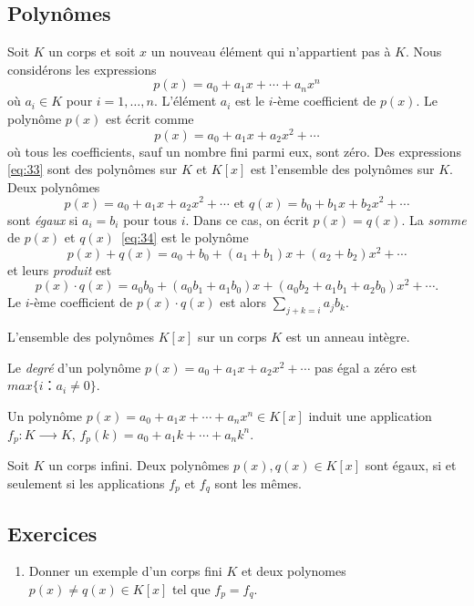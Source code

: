 \subsection{Polynômes}
\label{sec:polynomes}
Soit $K$ un corps et soit $x$ un nouveau élément qui n'appartient pas à $K$. Nous considérons les expressions 
\begin{equation}
  \label{eq:33}
  p(x) = a_0 + a_1 x + \cdots + a_n x^n
\end{equation}
où $a_i ∈K$ pour $i=1,\dots,n$.  L'élément $a_i$ est le $i$-ème coefficient de $p(x)$. Le polynôme $p(x)$ est écrit comme 
\begin{displaymath}
  p(x) = a_0 + a_1x + a_2x^2 + \cdots 
\end{displaymath}
où tous les  coefficients, sauf un nombre fini parmi eux, sont zéro. 
Des expressions \eqref{eq:33} sont des polynômes sur $K$  et $K[x]$ est l'ensemble des polynômes sur $K$. Deux polynômes 
\begin{equation}
  \label{eq:34}
  p(x) = a_0 + a_1x + a_2x^2 + \cdots \text{ et } q(x) = b_0 + b_1x + b_2x^2 + \cdots
  \end{equation}
  sont \emph{égaux} si $a_i  =b_i$ pour tous $i$. Dans ce cas, on écrit $p(x) = q(x)$. 
La \emph{somme} de $p(x)$ et $q(x)$~\eqref{eq:34} est le polynôme 
\begin{displaymath}
  p(x) + q(x)  = a_0+b_0 + (a_1+b_1)x + (a_2+b_2)x^2 + \cdots 
\end{displaymath}
et leurs \emph{produit} est 
\begin{displaymath}
  p(x) ⋅q(x) = a_0 b_0 + (a_0b_1 +a_1b_0) x + (a_0b_2+ a_1b_1 + a_2b_0)x^2 + \cdots .
\end{displaymath}
Le $i$-ème coefficient de $p(x)⋅q(x)$ est alors  $∑_{j+k=i}a_jb_k$. 

\begin{theorem}
  \label{thr:43}
  L'ensemble des polynômes $K[x]$ sur un corps $K$ est un anneau intègre. 
\end{theorem}

Le \emph{degré} d'un polynôme $p(x) = a_0 + a_1x + a_2x^2 + \cdots$ pas égal a zéro est $max\{i： a_i ≠0\}$. 

Un polynôme $p(x) = a_0 + a_1 x + \cdots + a_n x^n ∈ K[x]$ induit une application $f_p:  K ⟶ K$, $f_p(k) = a_0+ a_1 k+ \cdots + a_n k^n$. 

\begin{theorem}
  \label{thr:42}
  Soit $K$ un corps infini. Deux polynômes $p(x),q(x) ∈ K[x]$ sont égaux, si et seulement si les applications $f_p$ et $f_q$ sont les mêmes. 
\end{theorem}


\subsection*{Exercices}

\begin{enumerate}
\item Donner un exemple d'un corps fini $K$ et deux polynomes $p(x) ≠q(x) ∈ K[x]$ tel que $f_p=f_q$. 
\end{enumerate}



